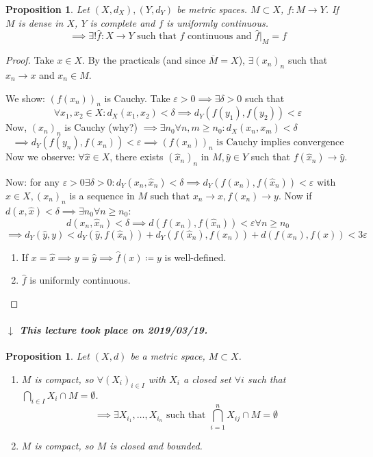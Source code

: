 \documentclass[a4paper]{article}
\newcounter{lecref}[section]
\numberwithin{lecref}{section}
\newtheorem{proposition}[lecref]{Proposition}
\newcommand{\dateref}[1]{%
  \begin{mdframed}[backgroundcolor=gray!10,innerbottommargin=0pt,innertopmargin=0pt]
    \paragraph{\textit{$\downarrow$ This lecture took place on #1.}}%
  \end{mdframed}%
}
\begin{document}
\begin{proposition}
	\label{proposition:1.17}
	Let $(X, d_X), (Y, d_Y)$ be metric spaces. $M \subset X$, $f: M \to Y$.
	If $M$ is dense in $X$, $Y$ is complete and $f$ is uniformly continuous.
	\[ \implies \exists! \hat f: X \to Y \text{ such that } \hat f \text{ continuous and } \hat f |_M = f \]
\end{proposition}

\begin{proof}
	Take $x \in X$. By the practicals (and since $\overline M = X$), $\exists (x_n)_n$ such that $x_n \to x$ and $x_n \in M$.

	We show: $(f(x_n))_n$ is Cauchy. Take $\varepsilon > 0 \implies \exists \delta > 0$ such that
	\[ \forall x_1, x_2 \in X: d_X(x_1, x_2) < \delta \implies d_Y(f(y_1), f(y_2)) < \varepsilon \]
	Now, $(x_n)_n$ is Cauchy (why?) $\implies \exists n_0 \forall n, m \geq n_0: d_X(x_n, x_m) < \delta$
	\[ \implies d_Y(f(y_n), f(x_n)) < \varepsilon \implies (f(x_n))_n \text{ is Cauchy implies convergence} \]
	Now we observe: $\forall \hat x \in X$, there exists $(\hat x_n)_n$ in $M, \hat y \in Y$ such that $f(\hat x_n) \to \hat y$.

	Now: for any $\varepsilon > 0 \exists \delta > 0: d_Y(x_n, \hat x_n) < \delta \implies d_Y(f(x_n), f(\hat x_n)) < \varepsilon$
	with $x \in X, (x_n)_n$ is a sequence in $M$ such that $x_n \to x, f(x_n) \to y$.
	Now if $d(x, \hat x) < \delta \implies \exists n_0 \forall n \geq n_0$:
	\[ d(x_n, \hat x_n) < \delta \implies d(f(x_n), f(\hat x_n)) < \varepsilon \forall n \geq n_0 \]
	\[ \implies d_Y(\hat y, y) < d_Y(\hat y, f(\hat x_n)) + d_Y(f(\hat x_n), f(x_n)) + d(f(x_n), f(x)) < 3 \varepsilon \]
	\begin{enumerate}
		\item If $x = \hat x \implies y = \hat y \implies \hat f(x) \coloneqq y$ is well-defined.
		\item $\hat f$ is uniformly continuous.
	\end{enumerate}
\end{proof}

\dateref{2019/03/19}

\begin{proposition}
	\label{prop:1.18}
	Let $(X, d)$ be a metric space, $M \subset X$.
	\begin{enumerate}
		\item $M$ is compact, so $\forall (X_i)_{i \in I}$ with $X_i$ a closed set $\forall i$ such that $\bigcap_{i \in I} X_i \cap M = \emptyset$.
			\[ \implies \exists X_{i_1}, \dots, X_{i_n} \text{ such that } \bigcap_{i=1}^n X_{ij} \cap M = \emptyset \]
		\item $M$ is compact, so $M$ is closed and bounded.
	\end{enumerate}
\end{proposition}
\end{document}
